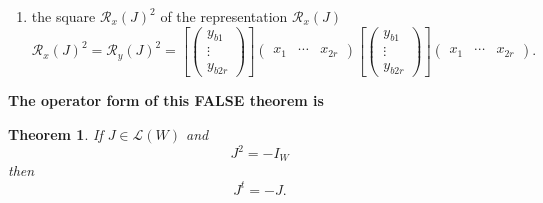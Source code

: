 \documentclass[aps,preprint]{revtex4}
\newtheorem{theorem}{Theorem}
\begin{document}
\begin{enumerate}
\begin{eqnarray}
\begin{array}{c}
\vdots \\ 
x_{b2r}%
\end{array}%
\right) \right] \left( 
\begin{array}{ccc}
x_{1} & \cdots & x_{2r}%
\end{array}%
\right) \left[ \left( 
\begin{array}{c}
y_{b1} \\ 
\vdots \\ 
y_{b2r}%
\end{array}%
\right) \right] \left( 
\begin{array}{ccc}
x_{1} & \cdots & x_{2r}%
\end{array}%
\right) =\left[ \left( 
\begin{array}{c}
y_{b1} \\ 
\vdots \\ 
y_{b2r}%
\end{array}%
\right) \right] \left( 
\begin{array}{ccc}
x_{1} & \cdots & x_{2r}%
\end{array}%
\right) .
\end{eqnarray}%
This produces

\item the square $\mathcal{R}_{x}\left( J\right) ^{2}$ of the representation 
$\mathcal{R}_{x}\left( J\right) $ 
\begin{equation}
\mathcal{R}_{x}\left( J\right) ^{2}=\mathcal{R}_{y}\left( J\right) ^{2}=%
\left[ \left( 
\begin{array}{c}
y_{b1} \\ 
\vdots \\ 
y_{b2r}%
\end{array}%
\right) \right] \left( 
\begin{array}{ccc}
x_{1} & \cdots & x_{2r}%
\end{array}%
\right) \left[ \left( 
\begin{array}{c}
y_{b1} \\ 
\vdots \\ 
y_{b2r}%
\end{array}%
\right) \right] \left( 
\begin{array}{ccc}
x_{1} & \cdots & x_{2r}%
\end{array}%
\right) .
\end{equation}
\end{enumerate}

\textbf{The operator form of this FALSE theorem is }

\begin{theorem}
If $J\in \mathcal{L}\left( W\right) $ and 
\begin{equation}
J^{2}=-I_{W}
\end{equation}%
then 
\begin{equation}
J^{t}=-J.
\end{equation}
\end{theorem}
\end{document}
